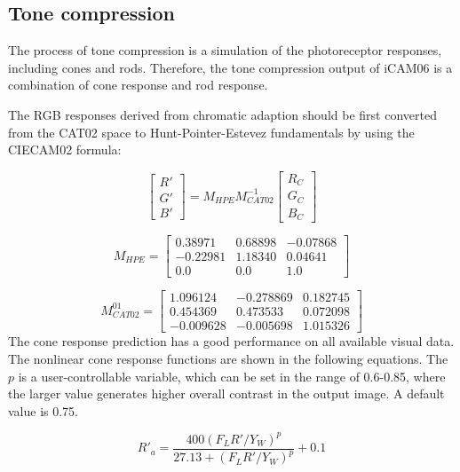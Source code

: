 \documentclass[10pt,twocolumn,letterpaper]{article}
\begin{document}
\subsection{Tone compression}
\label{sec:partd}
The process of tone compression is a simulation of the photoreceptor responses, including cones and rods. Therefore, the tone compression output of iCAM06 is a combination of cone response and rod response.

The RGB responses derived from chromatic adaption should be first converted from the CAT02 space to Hunt-Pointer-Estevez fundamentals by using the CIECAM02 formula:

\begin{equation}
	\left[
		\begin{array}{c}
		R'\\
		G'\\
		B'
		\end{array}
	\right]
	= M_{HPE}M_{CAT02}^{-1}
	\left[
		\begin{array}{c}
		R_C\\
		G_C\\
		B_C
		\end{array}
	\right]
\end{equation}

\begin{equation}
M_{HPE} = 
	\left[
		\begin{array}{ccc}
		0.38971&0.68898&-0.07868\\
		-0.22981&1.18340&0.04641\\
		0.0&0.0&1.0
		\end{array}
	\right]
\end{equation}

\begin{equation}
M_{CAT02}^{01} = 
	\left[
		\begin{array}{ccc}
		1.096124&-0.278869&0.182745\\
		0.454369&0.473533&0.072098\\
		-0.009628&-0.005698&1.015326
		\end{array}
	\right]
\end{equation}
The cone response prediction has a good performance on all available visual data. The nonlinear cone response functions are shown in the following equations. The $p$ is a user-controllable variable, which can be set in the range of 0.6-0.85, where the larger value generates higher overall contrast in the output image. A default value is 0.75.


\begin{equation}
	R'_a = \frac{400(F_LR'/Y_W)^p}{27.13+(F_LR'/Y_W)^p}+0.1
\end{equation}
\end{document}
